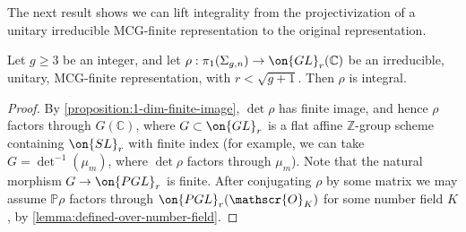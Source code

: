 The next result shows we can lift integrality from the projectivization of a unitary irreducible MCG-finite representation to the original representation.

\begin{lemma}
\notready
	\label{lemma:gl-defined-over-number-field}
	Let $g\geq 3$ be an integer, and let $\rho: \pi_1(\Sigma_{g,n})\to \on{GL}_r(\mathbb{C})$ be an irreducible, unitary, MCG-finite representation, with $r<\sqrt{g+1}$. Then $\rho$ is integral.
	\end{lemma}
\begin{proof}
By \autoref{proposition:1-dim-finite-image}, $\det\rho$ has finite image, and
hence $\rho$ factors through $G(\mathbb{C})$, where $G\subset \on{GL}_r$ is a
flat affine $\mathbb{Z}$-group scheme containing $\on{SL}_r$ with finite index (for
example, we can take $G=\det^{-1}(\mu_m)$, where $\det\rho$ factors through
$\mu_m$). Note that the natural morphism $G\to \on{PGL}_r$ is finite. After
conjugating $\rho$ by some matrix we may assume $\mathbb{P}\rho$ factors through
$\on{PGL}_r(\mathscr{O}_K)$ for some number field $K$, by \autoref{lemma:defined-over-number-field}.


\end{proof}
